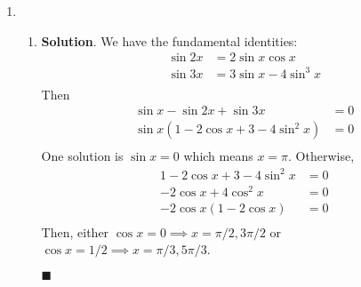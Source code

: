 \documentclass[12pt]{article}
\newenvironment*{sol}{\par \textbf{Solution}.}{\hfill$\blacksquare$}
\begin{document}
\begin{enumerate}
\begin{sol}
\begin{align*}
            \end{align*}
            If $2a=-3b$, we have \begin{align*}
                -12b+9b+6&=0\\
                b=-2 &a=3
            \end{align*}
            Then $a=-\dfrac{3}{7}$ or $a=3$.
        \end{sol}
        \item \begin{enumerate}
            \item \begin{sol}
                We have the fundamental identities:\begin{align*}
                    \sin{2x}&=2\sin{x}\cos{x}\\
                    \sin{3x}&=3\sin{x}-4\sin^3{x}\\
                \end{align*}
                Then \begin{align*}
                    \sin{x}-\sin{2x}+\sin{3x}&=0\\
                    \sin{x}(1-2\cos{x}+3-4\sin^2{x})&=0\\
                \end{align*}
                One solution is $\sin{x}=0$ which means $x=\pi$. Otherwise,\begin{align*}
                    1-2\cos{x}+3-4\sin^2{x}&=0\\
                    -2\cos{x}+4\cos^2{x}&=0\\
                    -2\cos{x}(1-2\cos{x})&=0\\
                \end{align*}
                Then, either $\cos{x}=0\implies x=\pi/2,3\pi/2$ or $\cos{x}=1/2\implies x=\pi/3,5\pi/3$.


\end{sol}
\end{enumerate}
\end{enumerate}
\end{document}
